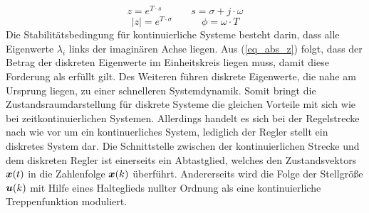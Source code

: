 \begin{equation}
z = e^{T\cdot s} \hspace{35pt} s = \sigma + j\cdot \omega
\end{equation}
\begin{equation}
\vert z \vert = e^{T\cdot \sigma} \hspace{35pt} \phi = \omega\cdot T
\label{eq_abs_z}
\end{equation}
Die Stabilitätsbedingung für kontinuierliche Systeme besteht darin, dass alle Eigenwerte $\lambda_i$ links der imaginären Achse liegen. Aus (\ref{eq_abs_z}) folgt, dass der Betrag der diskreten Eigenwerte im Einheitskreis liegen muss, damit diese Forderung als erfüllt gilt. Des Weiteren führen diskrete Eigenwerte, die nahe am Ursprung liegen, zu einer schnelleren Systemdynamik. Somit bringt die Zustandsraumdarstellung für diskrete Systeme die gleichen Vorteile mit sich wie bei zeitkontinuierlichen Systemen.
Allerdings handelt es sich bei der Regelstrecke nach wie vor um ein kontinuerliches System, lediglich der Regler stellt ein diskretes System dar. Die Schnittstelle zwischen der kontinuierlichen Strecke und dem diskreten Regler ist einerseits ein Abtastglied, welches den Zustandsvektors $\boldsymbol{x}(t)$ in die Zahlenfolge $\boldsymbol{x}(k)$ überführt. Andererseits wird die Folge der Stellgröße $\boldsymbol{u}(k)$ mit Hilfe eines Halteglieds nullter Ordnung als eine kontinuierliche Treppenfunktion moduliert.

